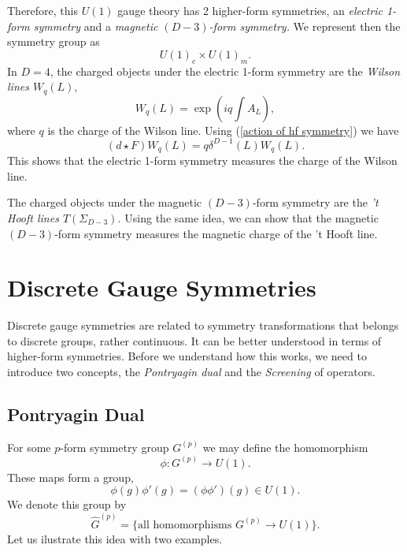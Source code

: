 \documentclass{article}
\begin{document}
Therefore, this $U(1)$ gauge theory has 2 higher-form symmetries, an \textit{electric 1-form symmetry} and a \textit{magnetic $(D-3)$-form symmetry.} We represent then the symmetry group as 
\begin{equation}
	U(1)_e\times U(1)_m. 
\end{equation}
In $D=4$, the charged objects under the electric 1-form symmetry are the \textit{Wilson lines $W_q(L)$},
\begin{equation}
	W_q(L)=\exp\left(iq\int A_L\right),
\end{equation}
where $q$ is the charge of the Wilson line. Using (\ref{action of hf symmetry}) we have
\begin{equation}
	(d\star F)W_q(L)=q\delta^{D-1}(L)W_q(L). 
\end{equation}
This shows that the electric 1-form symmetry measures the charge of the Wilson line.

The charged objects under the magnetic $(D-3)$-form symmetry are the \textit{'t Hooft lines $T(\Sigma_{D-3})$.} Using the same idea, we can show that the magnetic $(D-3)$-form symmetry measures the magnetic charge of the 't Hooft line. 
\section{Discrete Gauge Symmetries}
Discrete gauge symmetries are related to symmetry transformations that belongs to discrete groups, rather continuous. It can be better understood in terms of higher-form symmetries. Before we understand how this works, we need to introduce two concepts, the \textit{Pontryagin dual} and the \textit{Screening} of operators. 

\subsection{Pontryagin Dual}
For some $p$-form symmetry group $G^{(p)}$ we may define the homomorphism 
\begin{equation}
	\phi:G^{(p)}\to U(1). 
\end{equation}
These maps form a group, 
\begin{equation}
	\phi(g)\phi'(g)=(\phi\phi')(g)\in U(1).
\end{equation}
We denote this group by 
\begin{equation}
	\widehat{G}^{(p)}=\{\text{all homomorphisms }G^{(p)}\to U(1) \}.
\end{equation}
Let us ilustrate this idea with two examples. 
\end{document}
